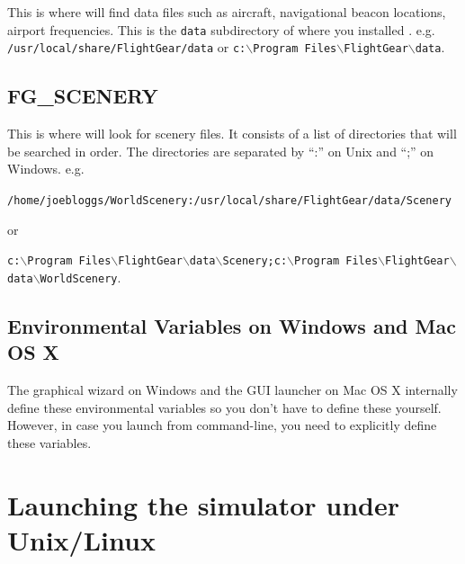 This is where \FlightGear{} will find data files such as aircraft, navigational
beacon locations, airport frequencies. This is the \texttt{data} subdirectory
of where you installed \FlightGear{}. e.g.
\texttt{/usr/local/share/FlightGear/data} or
\texttt{c:$\backslash$Program Files$\backslash$FlightGear$\backslash$data}.

\subsection{FG\_SCENERY}

This is where \FlightGear{} will look for scenery files. It consists of a list
of directories that will be searched in order. The directories are separated
by ``:'' on Unix and ``;'' on Windows. e.g.

\noindent
{\footnotesize{\texttt{/home/joebloggs/WorldScenery:/usr/local/share/FlightGear/data/Scenery}}}

\noindent
or

\noindent
{\footnotesize{\texttt{c:$\backslash$Program Files$\backslash$FlightGear$\backslash$data$\backslash$Scenery;c:$\backslash$Program Files$\backslash$FlightGear$\backslash$data$\backslash$WorldScenery}}}.

\subsection{Environmental Variables on Windows and Mac OS X}
The graphical wizard on Windows and the GUI launcher on Mac OS X internally define these environmental variables so you don't have to define these yourself. However, in case you launch \FlightGear{} from command-line, you need to explicitly define these variables. 

\section{Launching the simulator under Unix/Linux}

\centerline{}
\smallskip

